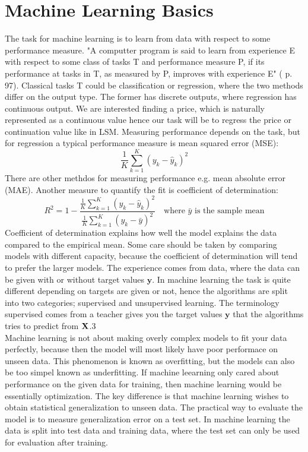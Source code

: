 \section{Machine Learning Basics}
The task for machine learning is to learn from data with respect to some performance measure. "A computter program is said to learn from experience E with respect to some class of tasks T and performance measure P, if its performance at tasks in T, as measured by P, improves with experience E" (\parencite{Goodfellow-et-al-2016} p. 97). Classical tasks T could be classification or regression, where the two methods differ on the output type. The former has discrete outputs, where regression has continuous output. We are interested finding a price, which is naturally represented as a continuous value hence our task will be to regress the price or continuation value like in LSM. Measuring performance depends on the task, but for regression a typical performance measure is mean squared error (MSE):
$$\frac{1}{K}\sum_{k=1}^{K} (y_k-\hat{y}_k)^2$$
There are other methdos for measuring performance e.g. mean absolute error (MAE). Another measure to quantify the fit is coefficient of determination:
$$R^2=1-\frac{\frac{1}{K}\sum_{k=1}^{K} (y_k-\hat{y}_k)^2}{\frac{1}{K}\sum_{k=1}^{K} (y_k-\bar{y})^2} \quad \text{where $\bar{y}$ is the sample mean}$$
Coefficient of determination explains how well the model explains the data compared to the empirical mean. Some care should be taken by comparing models with different capacity, because the coefficient of determination will tend to prefer the larger models. The experience comes from data, where the data can be given with or without target values $\bm{y}$. In machine learning the task is quite different depending on targets are given or not, hence the algorithms are split into two categories; supervised and unsupervised learning. The terminology supervised comes from a teacher gives you the target values $\bm{y}$ that the algorithms tries to predict from $\mathbf{X}$.3\\

Machine learning is not about making overly complex models to fit your data perfectly, because then the model will most likely have poor performace on unseen data. This phenomenon is known as overfitting, but the models can also be too simpel known as underfitting. If machine leearning only cared about performance on the given data for training, then machine learning would be essentially optimization. The key difference is that machine learning wishes to obtain statistical generalization to unseen data. The practical way to evaluate the model is to measure generalization error on a test set. In machine learning the data is split into test data and training data, where the test set can only be used for evaluation after training. \\

